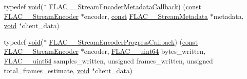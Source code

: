 \begin{DoxyCompactItemize}
\item 
typedef \hyperlink{png_8h_ac9c84fa68bbad002983e35ce3663c686}{void}($\ast$ \hyperlink{group__flac__stream__encoder_ga091fbf3340d85bcbda1090c31bc320cf}{F\+L\+A\+C\+\_\+\+\_\+\+Stream\+Encoder\+Metadata\+Callback}) (\hyperlink{zconf_8h_a2c212835823e3c54a8ab6d95c652660e}{const} \hyperlink{struct_f_l_a_c_____stream_encoder}{F\+L\+A\+C\+\_\+\+\_\+\+Stream\+Encoder} $\ast$encoder, \hyperlink{zconf_8h_a2c212835823e3c54a8ab6d95c652660e}{const} \hyperlink{struct_f_l_a_c_____stream_metadata}{F\+L\+A\+C\+\_\+\+\_\+\+Stream\+Metadata} $\ast$metadata, \hyperlink{png_8h_ac9c84fa68bbad002983e35ce3663c686}{void} $\ast$client\+\_\+data)
\item 
typedef \hyperlink{png_8h_ac9c84fa68bbad002983e35ce3663c686}{void}($\ast$ \hyperlink{group__flac__stream__encoder_ga6e051c0e5837433f9e7cd56cd42ca6ba}{F\+L\+A\+C\+\_\+\+\_\+\+Stream\+Encoder\+Progress\+Callback}) (\hyperlink{zconf_8h_a2c212835823e3c54a8ab6d95c652660e}{const} \hyperlink{struct_f_l_a_c_____stream_encoder}{F\+L\+A\+C\+\_\+\+\_\+\+Stream\+Encoder} $\ast$encoder, \hyperlink{ordinals_8h_aa78c8c70a3eb8a58af7436f278acde8e}{F\+L\+A\+C\+\_\+\+\_\+uint64} bytes\+\_\+written, \hyperlink{ordinals_8h_aa78c8c70a3eb8a58af7436f278acde8e}{F\+L\+A\+C\+\_\+\+\_\+uint64} samples\+\_\+written, unsigned frames\+\_\+written, unsigned total\+\_\+frames\+\_\+estimate, \hyperlink{png_8h_ac9c84fa68bbad002983e35ce3663c686}{void} $\ast$client\+\_\+data)
\end{DoxyCompactItemize}
